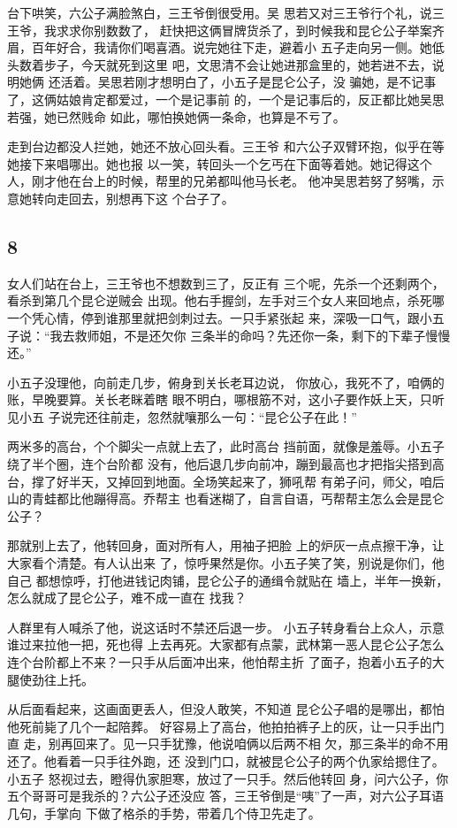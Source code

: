 台下哄笑，六公子满脸煞白，三王爷倒很受用。吴
思若又对三王爷行个礼，说三王爷，我求求你别数数了，
赶快把这俩冒牌货杀了，到时候我和昆仑公子举案齐
眉，百年好合，我请你们喝喜酒。说完她往下走，避着小
五子走向另一侧。她低头数着步子，今天就死到这里
吧，文思清不会让她进那盒里的，她若进不去，说明她俩
还活着。吴思若刚才想明白了，小五子是昆仑公子，没
骗她，是不记事了，这俩姑娘肯定都爱过，一个是记事前
的，一个是记事后的，反正都比她吴思若强，她已然贱命
如此，哪怕换她俩一条命，也算是不亏了。

走到台边都没人拦她，她还不放心回头看。三王爷
和六公子双臂环抱，似乎在等她接下来唱哪出。她也报
以一笑，转回头一个乞丐在下面等着她。她记得这个
人，刚才他在台上的时候，帮里的兄弟都叫他马长老。
他冲吴思若努了努嘴，示意她转向走回去，别想再下这
个台子了。
\newline

{\centering\subsection{8}}

女人们站在台上，三王爷也不想数到三了，反正有
三个呢，先杀一个还剩两个，看杀到第几个昆仑逆贼会
出现。他右手握剑，左手对三个女人来回地点，杀死哪
一个凭心情，停到谁那里就把剑刺过去。一只手紧张起
来，深吸一口气，跟小五子说：“我去救师姐，不是还欠你
三条半的命吗？先还你一条，剩下的下辈子慢慢还。”

小五子没理他，向前走几步，俯身到关长老耳边说，
你放心，我死不了，咱俩的账，早晚要算。关长老眯着瞎
眼不明白，哪根筋不对，这小子要作妖上天，只听见小五
子说完还往前走，忽然就嚷那么一句：“昆仑公子在此！”

两米多的高台，个个脚尖一点就上去了，此时高台
挡前面，就像是羞辱。小五子绕了半个圈，连个台阶都
没有，他后退几步向前冲，蹦到最高也才把指尖搭到高
台，撑了好半天，又掉回到地面。全场笑起来了，狮吼帮
有弟子问，师父，咱后山的青蛙都比他蹦得高。乔帮主
也看迷糊了，自言自语，丐帮帮主怎么会是昆仑公子？

那就别上去了，他转回身，面对所有人，用袖子把脸
上的炉灰一点点擦干净，让大家看个清楚。有人认出来
了，惊呼果然是你。小五子笑了笑，别说是你们，他自己
都想惊呼，打他进钱记肉铺，昆仑公子的通缉令就贴在
墙上，半年一换新，怎么就成了昆仑公子，难不成一直在
找我？

人群里有人喊杀了他，说这话时不禁还后退一步。
小五子转身看台上众人，示意谁过来拉他一把，死也得
上去再死。大家都有点蒙，武林第一恶人昆仑公子怎么
连个台阶都上不来？一只手从后面冲出来，他怕帮主折
了面子，抱着小五子的大腿使劲往上托。

从后面看起来，这画面更丢人，但没人敢笑，不知道
昆仑公子唱的是哪出，都怕他死前毙了几个一起陪葬。
好容易上了高台，他拍拍裤子上的灰，让一只手出门直
走，别再回来了。见一只手犹豫，他说咱俩以后两不相
欠，那三条半的命不用还了。他看着一只手往外跑，还
没到门口，就被昆仑公子的两个仇家给摁住了。小五子
怒视过去，瞪得仇家胆寒，放过了一只手。然后他转回
身，问六公子，你五个哥哥可是我杀的？六公子还没应
答，三王爷倒是“咦”了一声，对六公子耳语几句，手掌向
下做了格杀的手势，带着几个侍卫先走了。

